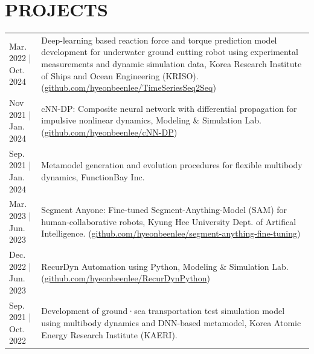 \documentclass[a4paper,10pt]{extarticle}
\begin{document}
\section*{PROJECTS}
\noindent
{}
\vspace*{-.5cm}
\begin{longtable}{LR}
	{Mar. 2022 | Oct. 2024} & Deep-learning based reaction force and torque prediction model development for underwater ground cutting robot using experimental measurements and dynamic simulation data, Korea Research Institute of Ships and Ocean Engineering (KRISO). (\href{https://github.com/hyeonbeenlee/TimeSeriesSeq2Seq}{github.com/hyeonbeenlee/TimeSeriesSeq2Seq}) \\
	{Nov 2021 | Jan. 2024}  & cNN-DP: Composite neural network with differential propagation for impulsive nonlinear dynamics, Modeling \& Simulation Lab. (\href{https://github.com/hyeonbeenlee/cNN-DP}{github.com/hyeonbeenlee/cNN-DP})                                                                                                                                       \\
	{Sep. 2021 | Jan. 2024} & Metamodel generation and evolution procedures for flexible multibody dynamics, FunctionBay Inc.                                                                                                                                                                                                                                                    \\
	{Mar. 2023 | Jun. 2023} & Segment Anyone: Fine-tuned Segment-Anything-Model (SAM) for human-collaborative robots, Kyung Hee University Dept. of Artifical Intelligence. (\href{https://github.com/hyeonbeenlee/segment-anything-fine-tuning}{github.com/hyeonbeenlee/segment-anything-fine-tuning})                                                                          \\
	{Dec. 2022 | Jun. 2023} & RecurDyn Automation using Python, Modeling \& Simulation Lab. (\href{https://github.com/hyeonbeenlee/RecurDynPython}{github.com/hyeonbeenlee/RecurDynPython})                                                                                                                                                                                      \\
	{Sep. 2021 | Oct. 2022} & Development of ground·sea transportation test simulation model using multibody dynamics and DNN-based metamodel, Korea Atomic Energy Research Institute (KAERI).                                                                                                                                                                                   \\
\end{longtable}
\end{document}
